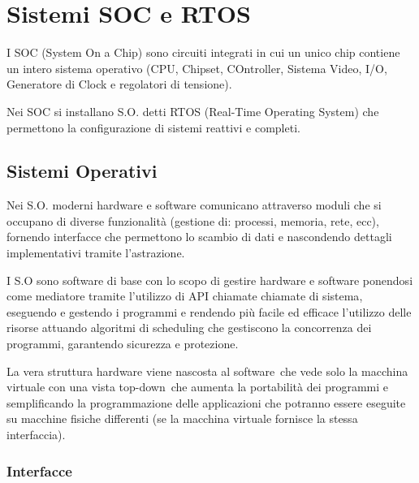 \documentclass[
]{article}
\begin{document}
{}

{}

{}

{}

\section{\texorpdfstring{{Sistemi SOC e
RTOS}}{Sistemi SOC e RTOS}}\label{h.fd7kc3qpt0kb}

{I SOC (System On a Chip) sono circuiti integrati in cui un unico chip
contiene un intero sistema operativo (CPU, Chipset, COntroller, Sistema
Video, I/O, Generatore di Clock e regolatori di tensione).}

{Nei SOC si installano S.O. detti RTOS (Real-Time Operating System) che
permettono la configurazione di sistemi reattivi e completi.}

{}

{}

\subsection{\texorpdfstring{{Sistemi
Operativi}}{Sistemi Operativi}}\label{h.heeqp9xmwn05}

{Nei S.O. moderni hardware e software comunicano attraverso moduli che
si occupano di diverse funzionalità (gestione di: processi, memoria,
rete, ecc), fornendo interfacce che permettono lo scambio di dati e
nascondendo dettagli implementativi tramite l'astrazione.}

{I S.O sono software di base con lo scopo di gestire hardware e software
ponendosi come mediatore tramite l'utilizzo di API chiamate }{chiamate
di sistema}{, eseguendo e gestendo i programmi e rendendo più facile ed
efficace l'utilizzo delle risorse attuando algoritmi di scheduling che
gestiscono la concorrenza dei programmi, garantendo sicurezza e
protezione.}

{}

{La vera struttura hardware viene nascosta }{al software}{~che vede solo
la macchina virtuale con una vista }{top-down}{~che aumenta la
portabilità dei programmi e semplificando la programmazione delle
applicazioni che potranno essere eseguite su macchine fisiche differenti
(se la macchina virtuale fornisce la stessa interfaccia).}

\subsubsection{\texorpdfstring{{Interfacce}}{Interfacce}}\label{h.24oczogbrynb}
\end{document}
